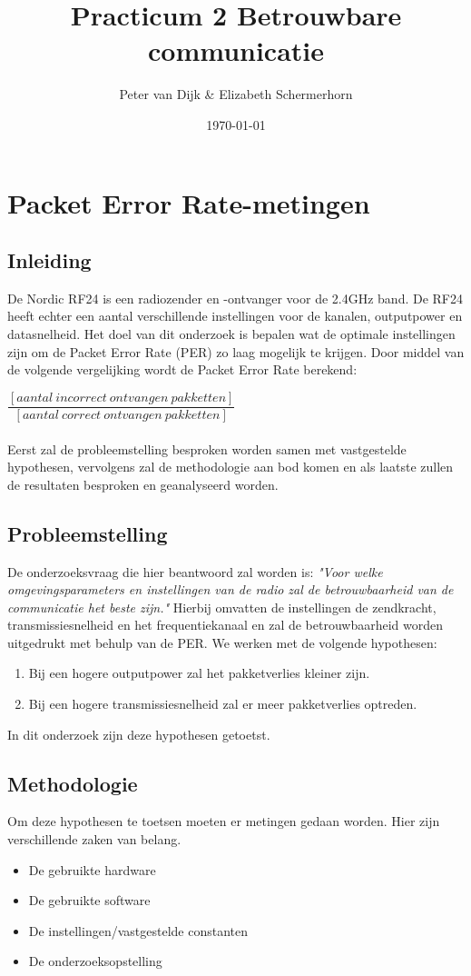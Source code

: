 \documentclass{article}
\author{Peter van Dijk \& Elizabeth Schermerhorn}
\date{\today}
\title{Practicum 2 Betrouwbare communicatie}
\begin{document}
\maketitle
\newpage
\tableofcontents
\clearpage
\section{Packet Error Rate-metingen}
\subsection{Inleiding}
De Nordic RF24 is een radiozender en -ontvanger voor de 2.4GHz band. De RF24 heeft echter een aantal verschillende instellingen voor de kanalen, outputpower en datasnelheid. Het doel van dit onderzoek is bepalen wat de optimale instellingen zijn om de Packet Error Rate (PER) zo laag mogelijk te krijgen. Door middel van de volgende vergelijking wordt de Packet Error Rate berekend: 
\setlength{\parskip}{10pt plus 1pt minus 1pt}

$\dfrac {[aantal\ incorrect\ ontvangen\ pakketten]}{[aantal\ correct\ ontvangen\ pakketten]}$\\
\\
Eerst zal de probleemstelling besproken worden samen met vastgestelde hypothesen, vervolgens zal de methodologie aan bod komen en als laatste zullen de resultaten besproken en geanalyseerd worden. 

\subsection{Probleemstelling}
De onderzoeksvraag die hier beantwoord zal worden is: \textit{"Voor welke omgevingsparameters en instellingen van de radio zal de betrouwbaarheid van de communicatie het beste zijn."} Hierbij omvatten de instellingen de zendkracht, transmissiesnelheid en het frequentiekanaal en zal de betrouwbaarheid worden uitgedrukt met behulp van de PER. We werken met de volgende hypothesen: 
\begin{enumerate}
  \item Bij een hogere outputpower zal het pakketverlies kleiner zijn.
  \item Bij een hogere transmissiesnelheid zal er meer pakketverlies optreden. 
\end{enumerate}
In dit onderzoek zijn deze hypothesen getoetst.

\subsection{Methodologie}
Om deze hypothesen te toetsen moeten er metingen gedaan worden. Hier zijn verschillende zaken van belang. 
\begin{itemize}
	\item De gebruikte hardware
	\item De gebruikte software
	\item De instellingen/vastgestelde constanten
	\item De onderzoeksopstelling
\end{itemize}
\end{document}
